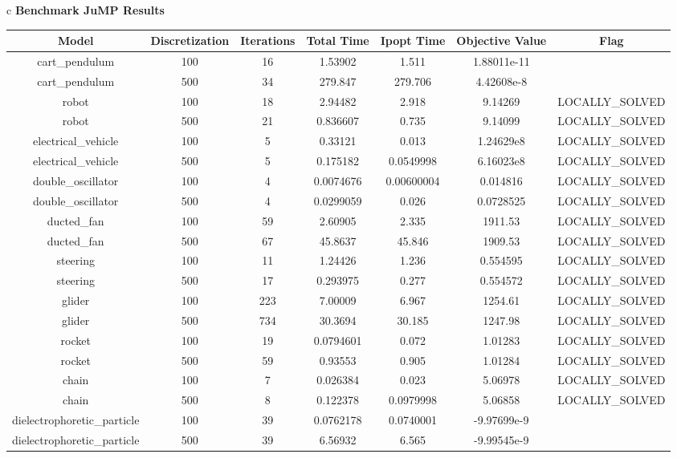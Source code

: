\documentclass{standalone}
\begin{document}
\begin{tabular}{c}
\hline
\Large\textbf{Benchmark JuMP Results}\\
\begin{tabular}{ccccccc}
  \hline
  \textbf{Model} & \textbf{Discretization} & \textbf{Iterations} & \textbf{Total Time} & \textbf{Ipopt Time} & \textbf{Objective Value} & \textbf{Flag} \\\hline
  cart\_pendulum & 100 & 16 & 1.53902 & 1.511 & 1.88011e-11 & \color{red}{LOCALLY\_INFEASIBLE} \\
  cart\_pendulum & 500 & 34 & 279.847 & 279.706 & 4.42608e-8 & \color{red}{LOCALLY\_INFEASIBLE} \\
  robot & 100 & 18 & 2.94482 & 2.918 & 9.14269 & LOCALLY\_SOLVED \\
  robot & 500 & 21 & 0.836607 & 0.735 & 9.14099 & LOCALLY\_SOLVED \\
  electrical\_vehicle & 100 & 5 & 0.33121 & 0.013 & 1.24629e8 & LOCALLY\_SOLVED \\
  electrical\_vehicle & 500 & 5 & 0.175182 & 0.0549998 & 6.16023e8 & LOCALLY\_SOLVED \\
  double\_oscillator & 100 & 4 & 0.0074676 & 0.00600004 & 0.014816 & LOCALLY\_SOLVED \\
  double\_oscillator & 500 & 4 & 0.0299059 & 0.026 & 0.0728525 & LOCALLY\_SOLVED \\
  ducted\_fan & 100 & 59 & 2.60905 & 2.335 & 1911.53 & LOCALLY\_SOLVED \\
  ducted\_fan & 500 & 67 & 45.8637 & 45.846 & 1909.53 & LOCALLY\_SOLVED \\
  steering & 100 & 11 & 1.24426 & 1.236 & 0.554595 & LOCALLY\_SOLVED \\
  steering & 500 & 17 & 0.293975 & 0.277 & 0.554572 & LOCALLY\_SOLVED \\
  glider & 100 & 223 & 7.00009 & 6.967 & 1254.61 & LOCALLY\_SOLVED \\
  glider & 500 & 734 & 30.3694 & 30.185 & 1247.98 & LOCALLY\_SOLVED \\
  rocket & 100 & 19 & 0.0794601 & 0.072 & 1.01283 & LOCALLY\_SOLVED \\
  rocket & 500 & 59 & 0.93553 & 0.905 & 1.01284 & LOCALLY\_SOLVED \\
  chain & 100 & 7 & 0.026384 & 0.023 & 5.06978 & LOCALLY\_SOLVED \\
  chain & 500 & 8 & 0.122378 & 0.0979998 & 5.06858 & LOCALLY\_SOLVED \\
  dielectrophoretic\_particle & 100 & 39 & 0.0762178 & 0.0740001 & -9.97699e-9 & \color{red}{LOCALLY\_INFEASIBLE} \\
  dielectrophoretic\_particle & 500 & 39 & 6.56932 & 6.565 & -9.99545e-9 & \color{red}{LOCALLY\_INFEASIBLE} \\\hline
\end{tabular}
\end{tabular}
\end{document}
